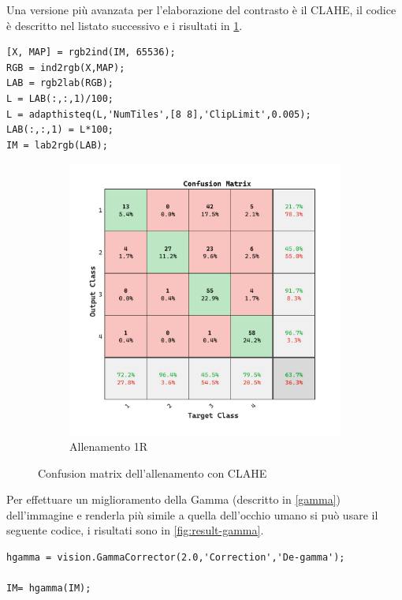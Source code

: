 Una versione più avanzata per l'elaborazione del contrasto è il CLAHE, il codice è descritto nel listato successivo e i risultati in \cref{fig:result-clahe}. 

\begin{lstlisting}
[X, MAP] = rgb2ind(IM, 65536);
RGB = ind2rgb(X,MAP);
LAB = rgb2lab(RGB);
L = LAB(:,:,1)/100;
L = adapthisteq(L,'NumTiles',[8 8],'ClipLimit',0.005);
LAB(:,:,1) = L*100;
IM = lab2rgb(LAB);
\end{lstlisting}

\begin{figure}[H]
    \centering
    \begin{subfigure}{0.49\textwidth}
        \includegraphics[width=\textwidth]{addestramento-rete-neurale/one-clahe.pdf}
        \caption{Allenamento 1R} 
    \end{subfigure}
    \caption{Confusion matrix dell'allenamento con  CLAHE}
    \label{fig:result-clahe}
\end{figure}

Per effettuare un miglioramento della Gamma (descritto in \cref{gamma}) dell'immagine e renderla più simile a quella dell'occhio umano si può usare il seguente codice, i risultati sono in \cref{fig:result-gamma}.

\begin{lstlisting}
hgamma = vision.GammaCorrector(2.0,'Correction','De-gamma');

IM= hgamma(IM);
\end{lstlisting}

